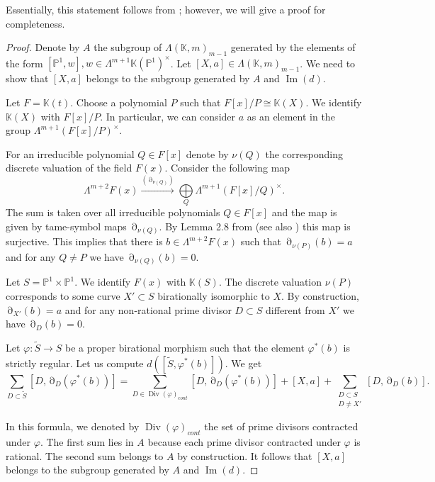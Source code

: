 \documentclass[12pt]{extarticle}
\def\mb{\mathbb}
\def\L{\Lambda}
\def\k{\mb K}
\def\wt{\widetilde}
\renewcommand{\P}{{\mb P}}
\DeclareMathOperator{\ts}{\partial}
\DeclareMathOperator{\im}{Im}
\DeclareMathOperator{\Div}{Div}
\begin{document}
Essentially, this statement follows from \cite[Theorem 2.6, (i)]{bolbachan_2023_chow}; however, we will give a proof for completeness.

\begin{proof}

Denote by $A$ the subgroup of $\L(\k,m)_{m-1}$ generated by the elements of the form $[\P^1, w], w\in \L^{m+1}\k(\P^1)^\times$. Let $[X,a]\in \L(\k,m)_{m-1}$. We need to show that $[X,a]$ belongs to the subgroup generated by $A$ and $\im(d)$. 

Let $F=\k(t)$. Choose a polynomial $P$ such that $F[x]/P\cong \k(X)$. We identify $\k(X)$ with $F[x]/P$. In particular, we can consider $a$ as an element in the group $\Lambda^{m+1}(F[x]/P)^\times$.

For an irreducible polynomial $Q\in F[x]$ denote by $\nu(Q)$ the corresponding discrete valuation of the field $F(x)$. Consider the following map
    $$\Lambda^{m+2}F(x)\xrightarrow{(\ts_{\nu(Q)})}\bigoplus\limits_{Q}\Lambda^{m+1}(F[x]/Q)^\times.$$
    The sum is taken over all irreducible polynomials $Q\in F[x]$ and the map is given by tame-symbol maps $\ts_{\nu(Q)}$. By Lemma 2.8 from \cite{bolbachan_2023_chow} (see also \cite{MILNOR1969/70}) this map is surjective. This implies that there is $b\in \Lambda^{m+2}F(x)$ such that $\ts_{\nu(P)}(b)=a$ and for any $Q\ne P$ we have $\ts_{\nu(Q)}(b)=0$.

Let $S=\P^1\times\P^1$. We identify $F(x)$ with $\k(S)$. The discrete valuation $\nu(P)$ corresponds to some curve $X'\subset S$ birationally isomorphic to $X$. By construction, $\ts_{X'}(b)=a$ and for any non-rational prime divisor $D\subset S$ different from $X'$ we have $\ts_{D}(b)=0$.

Let $\varphi\colon \wt S\to S$ be a proper birational morphism such that the element $\varphi^{*}(b)$ is strictly regular. Let us compute $d([\wt S, \varphi^*(b)])$. We get
$$\sum\limits_{D\subset \wt S}[D,\ts_D(\varphi^*(b))]=\sum\limits_{D\in \Div(\varphi)_{cont}}[D,\ts_D(\varphi^*(b))]+[X,a]+\sum\limits_{\substack{D\subset S\\D\ne X'}}[D,\ts_D(b)].$$

In this formula, we denoted by $\Div(\varphi)_{cont}$ the set of prime divisors contracted under $\varphi$. The first sum lies in $A$ because each prime divisor contracted under $\varphi$ is rational. The second sum belongs to $A$ by construction. It follows that $[X,a]$ belongs to the subgroup generated by $A$ and $\im(d)$. 
\end{proof}
\end{document}

